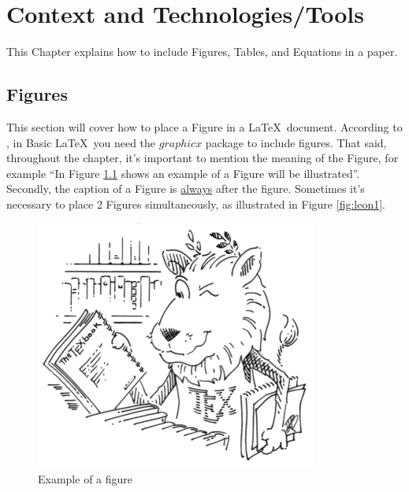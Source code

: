 \chapter{Context and Technologies/Tools}\label{cap2}

\begin{adjustwidth}{2.5cm}{1cm}
\small This Chapter explains how to include Figures, Tables, and Equations in a paper.
\end{adjustwidth}

\section{Figures}
This section will cover how to place a Figure in a \LaTeX~document.
According to \cite{overleaf}, in Basic \LaTeX~you need the $graphicx$ package to include figures. That said, throughout the chapter, it's important to mention the meaning of the Figure, for example ``In Figure \ref{fig:leon} shows an example of a Figure will be illustrated''. Secondly, the caption of a Figure is \underline{always} after the figure. Sometimes it's necessary to place 2 Figures simultaneously, as illustrated in Figure \ref{fig:leon1}.
\begin{figure}[htpb]
    \centering
    \includegraphics[scale=0.4]{lion_large.png}
    \caption{Example of a figure}
    \label{fig:leon}
\end{figure}
